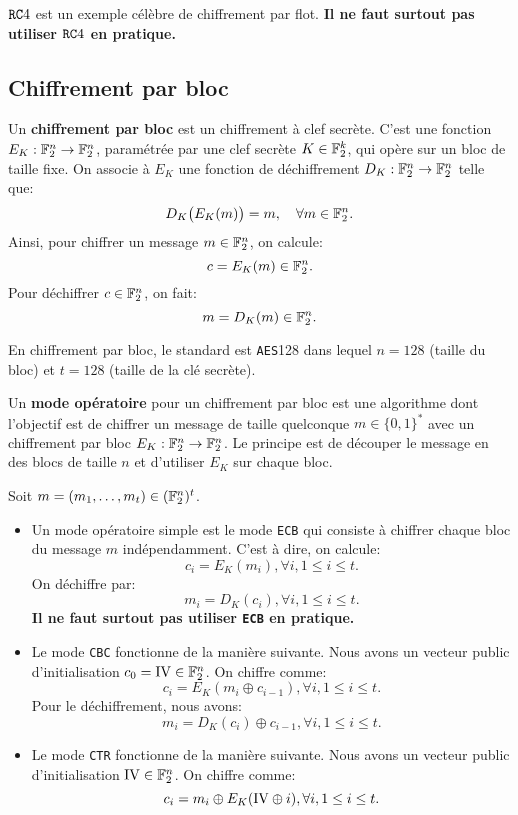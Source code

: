\documentclass{llncs}[11pt]
\begin{document}
\begin{example}
${\tt RC}4$  est un exemple célèbre de chiffrement par flot. {\bf Il ne faut surtout pas utiliser ${\tt RC}4$ en pratique.} 

\end{example}
\subsection{Chiffrement  par bloc}


\begin{definition}
Un {\bf chiffrement par bloc} est un chiffrement à clef secrète. C'est 
une fonction $E_K : \mathbb{F}_2^n \to  \mathbb{F}_2^n$, paramétrée par une clef secrète $K \in \mathbb{F}_2^k$, qui opère sur un bloc de taille fixe. On associe à $E_K$ 
une fonction de déchiffrement  $D_K : \mathbb{F}_2^n \to  \mathbb{F}_2^n$ telle que:
$$
D_K\big( E_K(m) \big)=m, \quad \forall m \in \mathbb{F}_2^n. 
$$    
Ainsi, pour chiffrer un message $m \in \mathbb{F}_2^n$, on calcule:
$$
c=E_K(m) \in \mathbb{F}_2^n. 
$$ 
Pour déchiffrer  $c \in \mathbb{F}_2^n$, on fait:
$$
m=D_K(m) \in \mathbb{F}_2^n. 
$$
\end{definition}
\begin{example}
En chiffrement par bloc, le standard est {\tt AES}128 dans lequel 
$n=128$ (taille du bloc) et $t=128$ (taille de la clé secrète).   
\end{example}

\begin{definition}
Un {\bf mode opératoire} pour un chiffrement par bloc est une algorithme dont l'objectif est de chiffrer un message de taille quelconque $m \in \{0,1\}^*$   
avec un chiffrement par bloc  $E_K : \mathbb{F}_2^n \to  \mathbb{F}_2^n$. Le principe est de découper le message en des blocs de taille $n$ et d'utiliser $E_K$ sur chaque bloc.     
\end{definition}
\begin{example}
Soit $m=(m_1,\ldots,m_t) \in  (\mathbb{F}_2^n)^t$. 
\begin{itemize}
\item Un mode opératoire simple est le mode {\tt ECB} qui consiste à chiffrer chaque bloc du message $m$ indépendamment. C'est à dire, on calcule:
$$
c_i=E_K(m_i), \forall i, 1 \leq i \leq t. 
$$      
On déchiffre par:
$$
m_i=D_K(c_i), \forall i, 1 \leq i \leq t. 
$$      
{\bf Il ne faut surtout pas utiliser {\tt ECB} en pratique.}
\item Le  mode {\tt CBC} fonctionne de la manière suivante. Nous avons un vecteur public d'initialisation $c_0={\rm IV} \in \mathbb{F}_2^n$. On chiffre comme:
$$
c_i=E_K(m_i \oplus c_{i-1}), \forall i, 1 \leq i \leq t. 
$$  
Pour le déchiffrement, nous avons:
$$
m_i=D_K(c_i) \oplus c_{i-1}, \forall i, 1 \leq i \leq t. 
$$  
 \item Le  mode {\tt CTR} fonctionne de la manière suivante. Nous avons un vecteur public d'initialisation ${\rm IV} \in \mathbb{F}_2^n$. On chiffre comme:
$$
c_i=m_i \oplus E_K( {\rm IV}  \oplus i), \forall i, 1 \leq i \leq t. 
$$  
 
\end{itemize}

\end{example}
\end{document}
